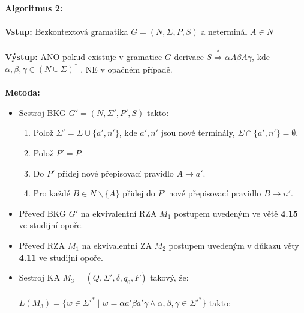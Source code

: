 \documentclass[a4paper,11pt]{article}[24.3.2010]
\begin{document}
\begin{enumerate}
{\bf Algoritmus 2:}\\\\
{\bf Vstup:} Bezkontextová gramatika $G=(N,\Sigma,P,S)$ a neterminál $A \in N$\\\\
{\bf Výstup:} ANO pokud existuje v gramatice $G$ derivace $S \overset{*}{\Rightarrow} \alpha A \beta A \gamma$, kde $\alpha,\beta,\gamma \in (N \cup \Sigma)^*$ , NE v opačném případě.\\\\
{\bf Metoda:}
\begin{itemize}
\item Sestroj BKG $G'=(N,\Sigma',P',S)$ takto:
\begin{enumerate}
\item Polož $\Sigma'=\Sigma \cup \{a',n'\}$, kde $a',n'$ jsou nové terminály, $\Sigma \cap \{a',n'\} = \emptyset$.
\item Polož $P'=P$.
\item Do $P'$ přidej nové přepisovací pravidlo $A \rightarrow a'$.
\item Pro každé $B \in N \backslash \{A\}$ přidej do $P'$ nové přepisovací pravidlo $B \rightarrow n'$.\\
\end{enumerate}
\item Převeď BKG $G'$ na ekvivalentní RZA $M_{1}$ postupem uvedeným ve větě \textbf{4.15} ve studijní opoře.\\
\item Převeď RZA $M_{1}$ na ekvivalentní ZA $M_{2}$ postupem uvedeným v důkazu věty \textbf{4.11} ve studijní opoře.\\
\item Sestroj KA $M_{3}=(Q,\Sigma',\delta,q_{0},F)$ takový, že:\\\\
$L(M_{3})=\{w \in \Sigma'^* \mid w = \alpha a' \beta a' \gamma \wedge \alpha, \beta, \gamma \in \Sigma'^*\}$ takto:\\\\

\end{itemize}
\end{enumerate}
\end{document}
